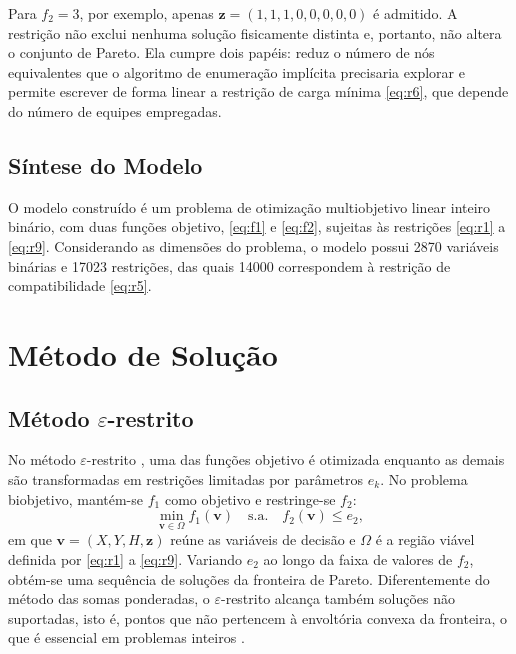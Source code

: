 \documentclass[conference]{IEEEtran}
\begin{document}
Para $f_2 = 3$, por exemplo, apenas $\mathbf{z} = (1,1,1,0,0,0,0,0)$ é admitido. A restrição não exclui nenhuma solução fisicamente distinta e, portanto, não altera o conjunto de Pareto. Ela cumpre dois papéis: reduz o número de nós equivalentes que o algoritmo de enumeração implícita precisaria explorar \cite{margot2010} e permite escrever de forma linear a restrição de carga mínima \eqref{eq:r6}, que depende do número de equipes empregadas.

\subsection{Síntese do Modelo}

O modelo construído é um problema de otimização multiobjetivo linear inteiro binário, com duas funções objetivo, \eqref{eq:f1} e \eqref{eq:f2}, sujeitas às restrições \eqref{eq:r1} a \eqref{eq:r9}. Considerando as dimensões do problema, o modelo possui 2870 variáveis binárias e 17023 restrições, das quais 14000 correspondem à restrição de compatibilidade \eqref{eq:r5}.

\section{Método de Solução}

\subsection{Método $\varepsilon$-restrito}

No método $\varepsilon$-restrito \cite{haimes1971,chankong1983}, uma das funções objetivo é otimizada enquanto as demais são transformadas em restrições limitadas por parâmetros $e_k$. No problema biobjetivo, mantém-se $f_1$ como objetivo e restringe-se $f_2$:
\begin{equation}
\min_{\mathbf{v}\in\Omega} f_1(\mathbf{v}) \quad \text{s.a.} \quad f_2(\mathbf{v}) \le e_2,
\label{eq:eps}
\end{equation}
em que $\mathbf{v} = (X, Y, H, \mathbf{z})$ reúne as variáveis de decisão e $\Omega$ é a região viável definida por \eqref{eq:r1} a \eqref{eq:r9}. Variando $e_2$ ao longo da faixa de valores de $f_2$, obtém-se uma sequência de soluções da fronteira de Pareto. Diferentemente do método das somas ponderadas, o $\varepsilon$-restrito alcança também soluções não suportadas, isto é, pontos que não pertencem à envoltória convexa da fronteira, o que é essencial em problemas inteiros \cite{mavrotas2009}.
\end{document}
